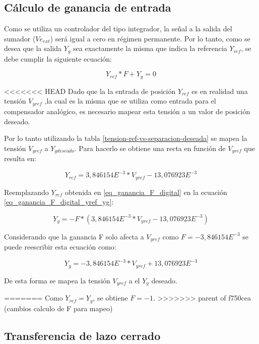 \subsection{Cálculo de ganancia de entrada}

Como se utiliza un controlador del tipo integrador, la señal a la salida del sumador ($Ve_{ext}$) será igual a cero en régimen permanente. Por lo tanto, como se desea que la salida $Y_g$ sea exactamente la misma que indica la referencia $Y_{ref}$, se debe cumplir la siguiente ecuación:

\begin{equation}
	Y_{ref}*F+Y_g=0
\end{equation}

<<<<<<< HEAD
Dado que la la entrada de posición $Y_{ref}$ es en realidad una tensión  $V_{yref}$ ,la cual es la misma que se utiliza como entrada para el compensador analógico, es necesario mapear esta tensión a un valor de posición deseado.

Por lo tanto utilizando la tabla \ref{tension-ref-vs-separacion-deseada} se mapea la tensión $V_{yref}$ a $Y_{gdeseado}$. Para hacerlo se obtiene una recta en función de $V_{yref}$ que resulta en:

\begin{equation}\label{eq_ganancia_F_digital}
	Y_{ref}=3,846154E^{-3}*V_{yref}-13,076923E^{-3}
\end{equation}

Reemplazando $Y_{ref}$ obtenida en \ref{eq_ganancia_F_digital} en la ecuación \ref{eq_ganancia_F_digital_yref_yg}:

\begin{equation}\label{eq_ganancia_F_digital_2}
	Y_g=-F*(3,846154E^{-3}*V_{yref}-13,076923E^{-3})
\end{equation}

Considerando que la ganancia F solo afecta a $V_{yref}$ como $F=-3,846154E^{-3}$ se puede reescribir esta ecuación como:

\begin{equation}\label{eq_ganancia_F_digital_3}
	Y_g=-3,846154E^{-3}*V_{yref}+13,076923E^{-3}
\end{equation}

De esta forma se mapea la tensión $V_{yref}$ a el $Y_g$ deseado.

=======
Como $Y_{ref}=Y_g$, se obtiene $F=-1$.
>>>>>>> parent of f750cea (cambios calculo de F para mapeo)

\subsection{Transferencia de lazo cerrado}

